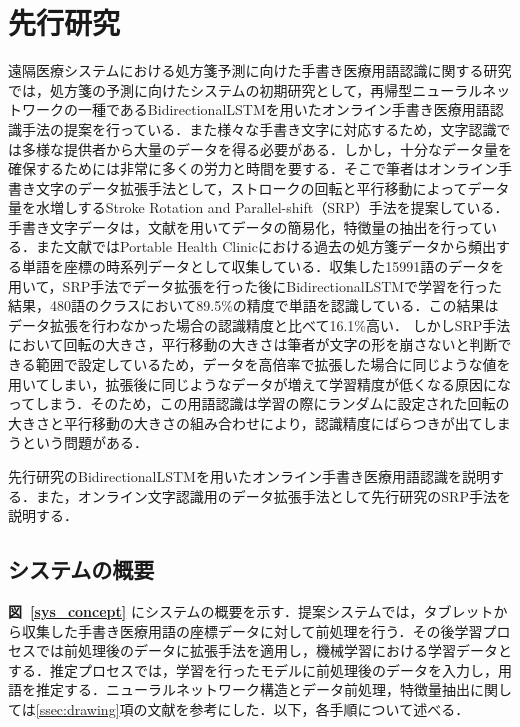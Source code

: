 \section{先行研究}
\label{sec:rel_4}
遠隔医療システムにおける処方箋予測に向けた手書き医療用語認識に関する研究\cite{takahashi}では，処方箋の予測に向けたシステムの初期研究として，再帰型ニューラルネットワークの一種であるBidirectionalLSTMを用いたオンライン手書き医療用語認識手法の提案を行っている．また様々な手書き文字に対応するため，文字認識では多様な提供者から大量のデータを得る必要がある．しかし，十分なデータ量を確保するためには非常に多くの労力と時間を要する．そこで筆者はオンライン手書き文字のデータ拡張手法として，ストロークの回転と平行移動によってデータ量を水増しするStroke Rotation and Parallel-shift（SRP）手法を提案している．
手書き文字データは，文献\cite{zhang18:drawing}を用いてデータの簡易化，特徴量の抽出を行っている．また文献\cite{takahashi}ではPortable Health Clinicにおける過去の処方箋データから頻出する単語を座標の時系列データとして収集している．収集した15991語のデータを用いて，SRP手法でデータ拡張を行った後にBidirectionalLSTMで学習を行った結果，480語のクラスにおいて89.5\%の精度で単語を認識している．この結果はデータ拡張を行わなかった場合の認識精度と比べて16.1\%高い．
しかしSRP手法において回転の大きさ，平行移動の大きさは筆者が文字の形を崩さないと判断できる範囲で設定しているため，データを高倍率で拡張した場合に同じような値を用いてしまい，拡張後に同じようなデータが増えて学習精度が低くなる原因になってしまう．そのため，この用語認識は学習の際にランダムに設定された回転の大きさと平行移動の大きさの組み合わせにより，認識精度にばらつきが出てしまうという問題がある．

先行研究\cite{takahashi}のBidirectionalLSTMを用いたオンライン手書き医療用語認識を説明する．また，オンライン文字認識用のデータ拡張手法として先行研究のSRP手法を説明する．

\subsection{システムの概要}
\label{sec:concept}
\textbf{図~\ref{sys_concept}} にシステムの概要を示す．提案システムでは，タブレットから収集した手書き医療用語の座標データに対して前処理を行う．その後学習プロセスでは前処理後のデータに拡張手法を適用し，機械学習における学習データとする．推定プロセスでは，学習を行ったモデルに前処理後のデータを入力し，用語を推定する．ニューラルネットワーク構造とデータ前処理，特徴量抽出に関しては\ref{ssec:drawing}項の文献\cite{takahashi}を参考にした．以下，各手順について述べる．

